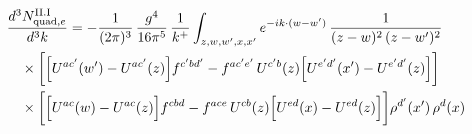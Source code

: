 \begingroup\small
\begin{align}\label{eq:H-II.I-2e}
&\frac{d^{3}N^{\rm II.I}_{{\rm quad},e}}{d^{3}k}=-\frac{1}{(2\pi)^{3}}\, \frac{g^{4}}{16\pi^{5}}\, \frac{1}{k^{+}} \int_{z,w,w',x,x'}e^{-ik\cdot(w-w')}\, \frac{1}{(z-w)^{2}\,(z-w')^{2}}\notag\\
&\quad \times\bigg[\Big[U^{ac'}(w')-U^{ac'}(z)\Big]f^{c'bd'} -f^{ac'e'}\, U^{c'b}(z)\Big[U^{e'd'}(x')-U^{e'd'}(z)\Big]\bigg]\notag\\
&\quad \times\bigg[\Big[U^{ac}(w)-U^{ac}(z)\Big]f^{cbd} -f^{ace}\, U^{cb}(z)\Big[U^{ed}(x)-U^{ed}(z)\Big]\bigg]\rho^{d'}(x')\, \rho^{d}(x)
\end{align}
\endgroup
